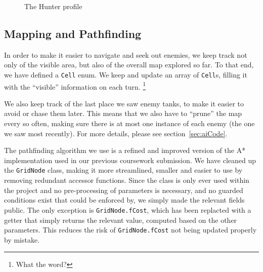 \documentclass[11pt]{article}
\begin{document}
{\begin{landscape}
\begin{figure}[h]
  \caption{The Hunter profile}
  \label{fig:hunter}
\end{figure}
\vspace*{\fill}
\end{landscape}
}

\subsection{Mapping and Pathfinding}

In order to make it easier to navigate and seek out enemies, we keep track not only of the visible area, but also of the overall map explored so far.  To that end, we have defined a \verb|Cell| enum. We keep and update an array of \verb|Cell|s, filling it with the ``visible'' information on each turn. \footnote{What the word?}

We also keep track of the last place we saw enemy tanks, to make it easier to avoid or chase them later. This means that we also have to ``prune'' the map every so often, making sure there is at most one instance of each enemy (the one we saw most recently). For more details, please see section~\ref{sec:aiCode}.

The pathfinding algorithm we use is a refined and improved version of the A* implementation used in our previous coursework submission\cite{theGloriousWe}. We have cleaned up the \verb|GridNode| class, making it more streamlined, smaller and easier to use by removing redundant accessor functions. Since the class is only ever used within the project and no pre-processing of parameters is necessary, and no guarded conditions exist that could be enforced by, we simply made the relevant fields public. The only exception is \verb|GridNode.fCost|, which has been replacted with a getter that simply returns the relevant value, computed based on the other parameters. This reduces the risk of \verb|GridNode.fCost| not being updated properly by mistake.
\end{document}
